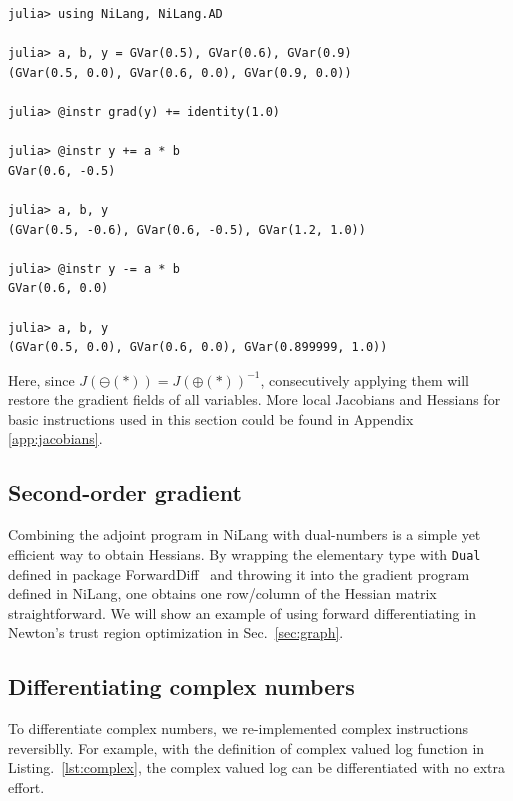 \documentclass{article}
\newcommand{\<}{\langle}
\renewcommand{\>}{\rangle}
\newcommand{\Lst}[1]{Listing.~\ref{#1}}
\newcommand{\Sec}[1]{Sec.~\ref{#1}}
\newcommand{\App}[1]{Appendix \ref{#1}}
\theoremstyle{definition}\newtheorem{definition}{\textit{Definition}}
\begin{document}
\begin{minipage}{.88\columnwidth}
\begin{lstlisting}[mathescape=true]
julia> using NiLang, NiLang.AD

julia> a, b, y = GVar(0.5), GVar(0.6), GVar(0.9)
(GVar(0.5, 0.0), GVar(0.6, 0.0), GVar(0.9, 0.0))

julia> @instr grad(y) += identity(1.0)

julia> @instr y += a * b
GVar(0.6, -0.5)

julia> a, b, y
(GVar(0.5, -0.6), GVar(0.6, -0.5), GVar(1.2, 1.0))

julia> @instr y -= a * b
GVar(0.6, 0.0)

julia> a, b, y
(GVar(0.5, 0.0), GVar(0.6, 0.0), GVar(0.899999, 1.0))
\end{lstlisting}
\end{minipage}

Here, since $J(\ominus(*)) = J(\oplus(*))^{-1}$, consecutively applying them will restore the gradient fields of all variables.
More local Jacobians and Hessians for basic instructions used in this section could be found in \App{app:jacobians}.

\subsection{Second-order gradient}
Combining the adjoint program in NiLang with dual-numbers is a simple yet efficient way to obtain Hessians.
By wrapping the elementary type with \texttt{Dual} defined in package ForwardDiff~\cite{Revels2016} and throwing it into the gradient program defined in NiLang,
one obtains one row/column of the Hessian matrix straightforward.
We will show an example of using forward differentiating in Newton's trust region optimization in \Sec{sec:graph}.

\subsection{Differentiating complex numbers}
To differentiate complex numbers, we re-implemented complex instructions reversiblly. For example, with the definition of complex valued log function in \Lst{lst:complex}, the complex valued log can be differentiated with no extra effort.
\end{document}
